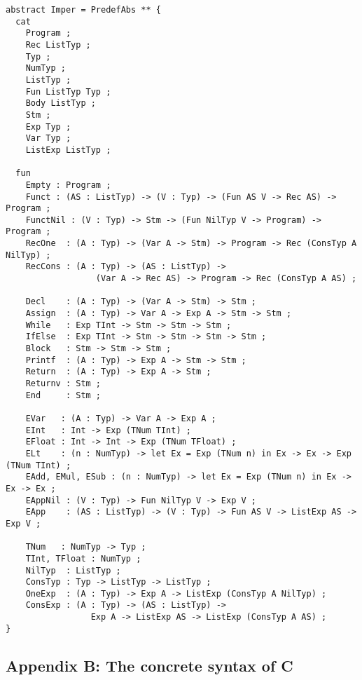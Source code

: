 \documentclass[12pt]{article}
\begin{document}
\small
\begin{verbatim}
abstract Imper = PredefAbs ** {
  cat
    Program ;
    Rec ListTyp ;
    Typ ;
    NumTyp ;
    ListTyp ;
    Fun ListTyp Typ ;
    Body ListTyp ;
    Stm ;
    Exp Typ ;
    Var Typ ;
    ListExp ListTyp ;

  fun
    Empty : Program ;
    Funct : (AS : ListTyp) -> (V : Typ) -> (Fun AS V -> Rec AS) -> Program ;
    FunctNil : (V : Typ) -> Stm -> (Fun NilTyp V -> Program) -> Program ;
    RecOne  : (A : Typ) -> (Var A -> Stm) -> Program -> Rec (ConsTyp A NilTyp) ;
    RecCons : (A : Typ) -> (AS : ListTyp) -> 
                  (Var A -> Rec AS) -> Program -> Rec (ConsTyp A AS) ;

    Decl    : (A : Typ) -> (Var A -> Stm) -> Stm ;
    Assign  : (A : Typ) -> Var A -> Exp A -> Stm -> Stm ;
    While   : Exp TInt -> Stm -> Stm -> Stm ;
    IfElse  : Exp TInt -> Stm -> Stm -> Stm -> Stm ;
    Block   : Stm -> Stm -> Stm ;
    Printf  : (A : Typ) -> Exp A -> Stm -> Stm ;
    Return  : (A : Typ) -> Exp A -> Stm ;
    Returnv : Stm ;
    End     : Stm ;

    EVar   : (A : Typ) -> Var A -> Exp A ;
    EInt   : Int -> Exp (TNum TInt) ;
    EFloat : Int -> Int -> Exp (TNum TFloat) ;
    ELt    : (n : NumTyp) -> let Ex = Exp (TNum n) in Ex -> Ex -> Exp (TNum TInt) ;
    EAdd, EMul, ESub : (n : NumTyp) -> let Ex = Exp (TNum n) in Ex -> Ex -> Ex ;
    EAppNil : (V : Typ) -> Fun NilTyp V -> Exp V ;
    EApp    : (AS : ListTyp) -> (V : Typ) -> Fun AS V -> ListExp AS -> Exp V ;

    TNum   : NumTyp -> Typ ;  
    TInt, TFloat : NumTyp ;
    NilTyp  : ListTyp ;
    ConsTyp : Typ -> ListTyp -> ListTyp ;
    OneExp  : (A : Typ) -> Exp A -> ListExp (ConsTyp A NilTyp) ;
    ConsExp : (A : Typ) -> (AS : ListTyp) -> 
                 Exp A -> ListExp AS -> ListExp (ConsTyp A AS) ;
}
\end{verbatim}
\normalsize
\newpage


\subsection*{Appendix B: The concrete syntax of C}
\end{document}

